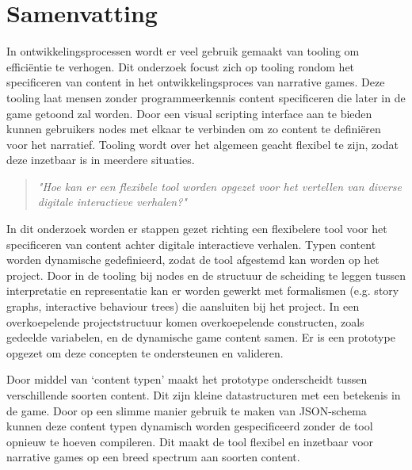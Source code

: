 \chapter*{Samenvatting}
In ontwikkelingsprocessen wordt er veel gebruik gemaakt van tooling om efficiëntie te verhogen. Dit onderzoek focust zich op tooling rondom het specificeren van content in het ontwikkelingsproces van narrative games. Deze tooling laat mensen zonder programmeerkennis content specificeren die later in de game getoond zal worden. Door een visual scripting interface aan te bieden kunnen gebruikers nodes met elkaar te verbinden om zo content te definiëren voor het narratief.
Tooling wordt over het algemeen geacht flexibel te zijn, zodat deze inzetbaar is in meerdere situaties.
\begin{quote} 
    \centering
    \large
    \textit{
        "Hoe kan er een flexibele tool worden opgezet voor het vertellen van diverse digitale interactieve verhalen?"
    }
\end{quote}

\noindent In dit onderzoek worden er stappen gezet richting een flexibelere tool voor het specificeren van content achter digitale interactieve verhalen. Typen content worden dynamische gedefinieerd, zodat de tool afgestemd kan worden op het project. Door in de tooling bij nodes en de structuur de scheiding te leggen tussen interpretatie en representatie kan er worden gewerkt met formalismen (e.g. story graphs, interactive behaviour trees) die aansluiten bij het project. In een overkoepelende projectstructuur komen overkoepelende constructen, zoals gedeelde variabelen, en de dynamische game content samen. Er is een prototype opgezet om deze concepten te ondersteunen en valideren.
%

Door middel van ‘content typen’ maakt het prototype onderscheidt tussen verschillende soorten content. Dit zijn kleine datastructuren met een betekenis in de game. Door op een slimme manier gebruik te maken van JSON-schema kunnen deze content typen dynamisch worden gespecificeerd zonder de tool opnieuw te hoeven compileren. Dit maakt de tool flexibel en inzetbaar voor narrative games op een breed spectrum aan soorten content.

